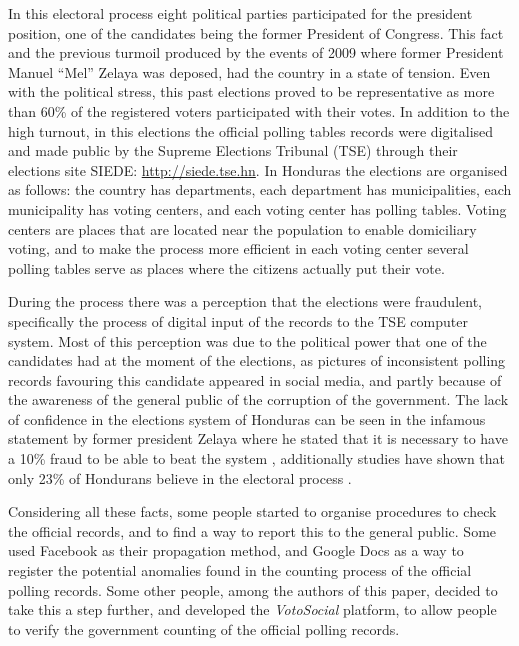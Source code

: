 \documentclass[letterpaper,10pt]{article}
\begin{document}
In this electoral process eight political parties participated for the president position, one of the candidates being the former President of Congress. This fact and the previous turmoil produced by the events of 2009 where former President Manuel “Mel” Zelaya was deposed, had the country in a state of tension. Even with the political stress, this past elections proved to be representative as more than 60\% of the registered voters participated with their votes. In addition to the high turnout, in this elections the official polling tables records were digitalised and made public by the Supreme Elections Tribunal (TSE) through their elections site SIEDE: \url{http://siede.tse.hn}. In Honduras the elections are organised as follows: the country has departments, each department has municipalities, each municipality has voting centers, and each voting center has polling tables. Voting centers are places that are located near the population to enable domiciliary voting, and to make the process more efficient in each voting center several polling tables serve as places where the citizens actually put their vote.

During the process there was a perception that the elections were fraudulent, specifically the process of digital input of the records to the TSE computer system. Most of this perception was due to the political power that one of the candidates had at the moment of the elections, as pictures of inconsistent polling records favouring this candidate appeared in social media, and partly because of the awareness of the general public of the corruption of the government. The lack of confidence in the elections system of Honduras can be seen in the infamous statement by former president Zelaya where he stated that it is necessary to have a 10\% fraud to be able to beat the system \citep{melvid}, additionally studies have shown that only 23\% of Hondurans believe in the electoral process \citep{romero2014}.

Considering all these facts, some people started to organise procedures to check the official records, and to find a way to report this to the general public. Some used Facebook as their propagation method, and Google Docs as a way to register the potential anomalies found in the counting process of the official polling records. Some other people, among the authors of this paper, decided to take this a step further, and developed the \textit{VotoSocial} platform, to allow people to verify the government counting of the official polling records.
\end{document}
